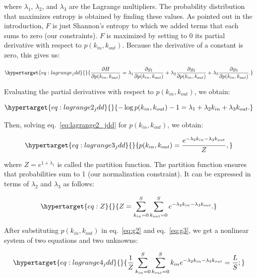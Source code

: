 \documentclass[11pt]{article}
\begin{document}
where \(\lambda_1\), \(\lambda_2\), and \(\lambda_3\) are the Lagrange
multipliers. The probability distribution that maximizes entropy is
obtained by finding these values. As pointed out in the introduction,
\(F\) is just Shannon's entropy to which we added terms that each sums
to zero (our constraints). \(F\) is maximized by setting to 0 its
partial derivative with respect to \(p(k_{in},k_{out})\). Because the
derivative of a constant is zero, this gives us:

\begin{equation}\protect\hypertarget{eq:lagrange_jdd}{}{\frac{\partial H}{\partial p(k_{in},k_{out})} = \lambda_1 \frac{\partial g_1}{\partial p(k_{in},k_{out})} + \lambda_2 \frac{\partial g_2}{\partial p(k_{in},k_{out})}+ \lambda_3 \frac{\partial g_3}{\partial p(k_{in},k_{out})}.}\label{eq:lagrange_jdd}\end{equation}

Evaluating the partial derivatives with respect to
\(p(k_{in},k_{out})\), we obtain:

\begin{equation}\protect\hypertarget{eq:lagrange2_jdd}{}{-\log p(k_{in},k_{out}) - 1 = \lambda_1 + \lambda_2 k_{in} + \lambda_3 k_{out}.}\label{eq:lagrange2_jdd}\end{equation}

Then, solving eq.~\ref{eq:lagrange2_jdd} for \(p(k_{in},k_{out})\), we
obtain:

\begin{equation}\protect\hypertarget{eq:lagrange3_jdd}{}{p(k_{in},k_{out}) = \frac{e^{-\lambda_2k_{in}-\lambda_3k_{out}}}{Z},}\label{eq:lagrange3_jdd}\end{equation}

where \(Z = e^{1+\lambda_1}\) is called the partition function. The
partition function ensures that probabilities sum to 1 (our
normalization constraint). It can be expressed in terms of \(\lambda_2\)
and \(\lambda_3\) as follows:

\begin{equation}\protect\hypertarget{eq:Z}{}{Z = \sum_{k_{in}=0}^S\sum_{k_{out}=0}^S e^{-\lambda_2k_{in}-\lambda_3k_{out}}.}\label{eq:Z}\end{equation}

After substituting \(p(k_{in},k_{out})\) in eq.~\ref{eq:g2} and
eq.~\ref{eq:g3}, we get a nonlinear system of two equations and two
unknowns:

\begin{equation}\protect\hypertarget{eq:lagrange4_jdd}{}{\frac{1}{Z}\sum_{k_{in}=0}^S\sum_{k_{out}=0}^S k_{in} e^{-\lambda_2k_{in}-\lambda_3k_{out}}  = \frac{L}{S};}\label{eq:lagrange4_jdd}\end{equation}
\end{document}
